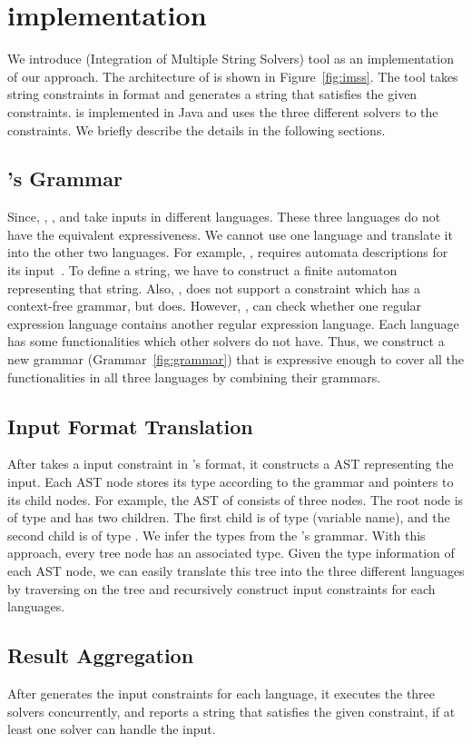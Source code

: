 \section{implementation}
\label{sec:implementation}
We introduce \imss (Integration of Multiple String Solvers) tool as
an implementation of our approach. The architecture of \imss is shown
in Figure~\ref{fig:imss}. The tool takes string constraints in \imss format
and generates a string that satisfies the given constraints. \imss is
implemented in Java and uses the three different solvers to the constraints.
We briefly describe the details in the following sections.

\subsection{\imss's Grammar}
Since, \hampi, \dprle, and \zstr take inputs in
 different languages. These three languages do not have the equivalent expressiveness.
 We cannot use one language and translate it into the other two languages. For example,
 \dprle, requires automata descriptions for its input~\cite{lazystrings2010}.
 To define a string, we have to construct a finite automaton representing that string.
 Also, \dprle, does not support a constraint which has a context-free grammar,
 but \hampi does. However, \dprle, can check whether one regular expression language
 contains another regular expression language. Each language has some functionalities which
 other solvers do not have. Thus, we construct a new grammar (Grammar~\ref{fig:grammar}) that is expressive enough to
 cover all the functionalities in all three languages by combining their grammars.

\subsection{Input Format Translation}
After \imss takes a input constraint in \imss's format, it constructs a AST representing the input.
Each AST node stores its type according to the grammar and pointers to its child nodes.
For example, the AST of  consists of three nodes. The root node is of type
 and has two children. The first child is of type  (variable name), and
the second child is of type . We infer the types from the \imss's grammar.
With this approach, every tree node has an associated type. Given the type information of
each AST node, we can easily translate this tree into the three different languages by traversing
on the tree and recursively construct input constraints for each languages.

\subsection{Result Aggregation}
After \imss generates the input constraints for each language, it executes the three solvers concurrently, and
reports a string that satisfies the given constraint, if at least one solver can handle the input.
